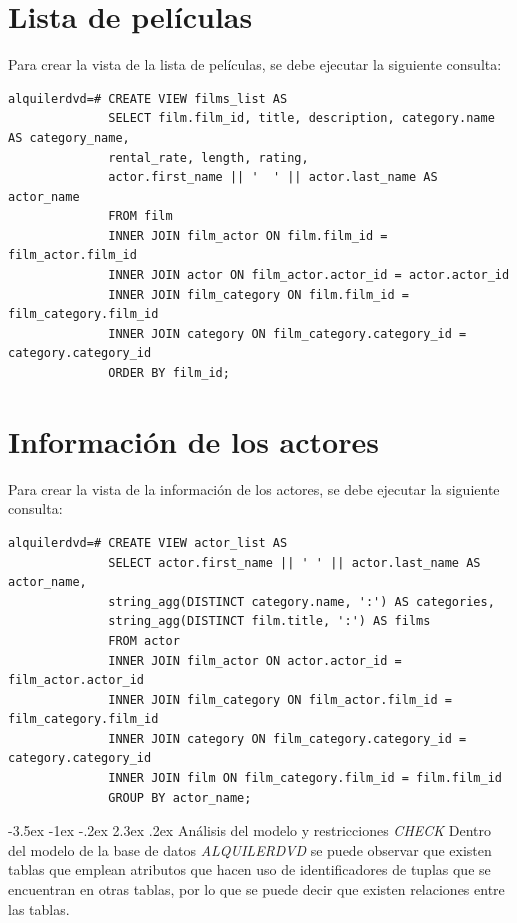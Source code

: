 \documentclass{report}
\makeatletter
\renewcommand\chapter{\@startsection{chapter}{0}{\z@}%
    {-3.5ex \@plus -1ex \@minus -.2ex}%
    {2.3ex \@plus.2ex}%
    {\normalfont\Large\bfseries}}
\makeatother
\begin{document}
\section{Lista de películas}
Para crear la vista de la lista de películas, se debe ejecutar la siguiente consulta:
\begin{verbatim}
alquilerdvd=# CREATE VIEW films_list AS
              SELECT film.film_id, title, description, category.name AS category_name, 
              rental_rate, length, rating,
              actor.first_name || '  ' || actor.last_name AS actor_name
              FROM film
              INNER JOIN film_actor ON film.film_id = film_actor.film_id
              INNER JOIN actor ON film_actor.actor_id = actor.actor_id
              INNER JOIN film_category ON film.film_id = film_category.film_id
              INNER JOIN category ON film_category.category_id = category.category_id
              ORDER BY film_id;
\end{verbatim}

\section{Información de los actores}
Para crear la vista de la información de los actores, se debe ejecutar la siguiente consulta:
\begin{verbatim}
alquilerdvd=# CREATE VIEW actor_list AS
              SELECT actor.first_name || ' ' || actor.last_name AS actor_name,
              string_agg(DISTINCT category.name, ':') AS categories,
              string_agg(DISTINCT film.title, ':') AS films
              FROM actor
              INNER JOIN film_actor ON actor.actor_id = film_actor.actor_id
              INNER JOIN film_category ON film_actor.film_id = film_category.film_id
              INNER JOIN category ON film_category.category_id = category.category_id
              INNER JOIN film ON film_category.film_id = film.film_id
              GROUP BY actor_name;
\end{verbatim}

\cleardoublepage

\chapter{Análisis del modelo y restricciones \emph{CHECK}}
Dentro del modelo de la base de datos \emph{ALQUILERDVD} se puede observar que existen tablas que emplean atributos
que hacen uso de identificadores de tuplas que se encuentran en otras tablas, por lo que se puede decir que existen
relaciones entre las tablas. 
\end{document}
